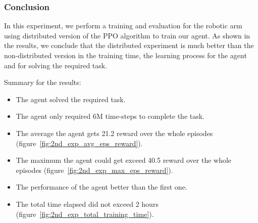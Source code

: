 \subsubsection{Conclusion}

In this experiment, we perform a training and evaluation for the robotic arm using distributed version of the PPO algorithm to train our agent. As shown in the results, we conclude that the distributed experiment is much better than the non-distributed version in the training time, the learning process for the agent and for solving the required task.

Summary for the results:
\begin{itemize}
	\item The agent solved the required task.
	\item The agent only required 6M time-steps to complete the task.
	\item The average the agent gets 21.2 reward over the whole episodes (figure~\ref{fig:2nd_exp_avg_eps_reward}).
	\item The maximum the agent could get exceed 40.5 reward over the whole episodes (figure~\ref{fig:2nd_exp_max_eps_reward}).
	\item The performance of the agent better than the first one.
	\item The total time elapsed did not exceed 2 hours (figure~\ref{fig:2nd_exp_total_training_time}).
\end{itemize}